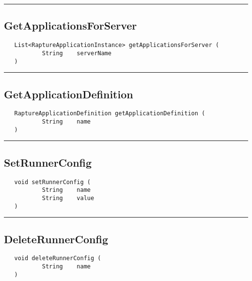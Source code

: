 \rule{15cm}{2pt}
\subsection{GetApplicationsForServer}
\label{Api:GetApplicationsForServer}
\begin{verbatim}
   List<RaptureApplicationInstance> getApplicationsForServer (
           String    serverName
   )
\end{verbatim}



\rule{15cm}{2pt}
\subsection{GetApplicationDefinition}
\label{Api:GetApplicationDefinition}
\begin{verbatim}
   RaptureApplicationDefinition getApplicationDefinition (
           String    name
   )
\end{verbatim}



\rule{15cm}{2pt}
\subsection{SetRunnerConfig}
\label{Api:SetRunnerConfig}
\begin{verbatim}
   void setRunnerConfig (
           String    name
           String    value
   )
\end{verbatim}



\rule{15cm}{2pt}
\subsection{DeleteRunnerConfig}
\label{Api:DeleteRunnerConfig}
\begin{verbatim}
   void deleteRunnerConfig (
           String    name
   )
\end{verbatim}



